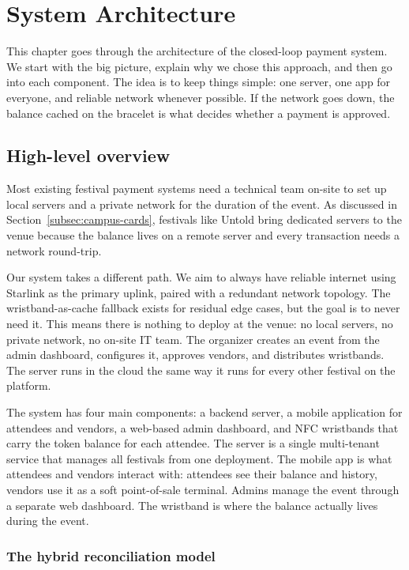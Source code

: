 \chapter{System Architecture}
\label{chap:architecture}

This chapter goes through the architecture of the closed-loop payment system. We start with the big picture, explain why we chose this approach, and then go into each component. The idea is to keep things simple: one server, one app for everyone, and reliable network whenever possible. If the network goes down, the balance cached on the bracelet is what decides whether a payment is approved.

\section{High-level overview}
\label{sec:high-level-overview}

Most existing festival payment systems need a technical team on-site to set up local servers and a private network for the duration of the event. As discussed in Section~\ref{subsec:campus-cards}, festivals like Untold bring dedicated servers to the venue because the balance lives on a remote server and every transaction needs a network round-trip.

Our system takes a different path. We aim to always have reliable internet using Starlink as the primary uplink, paired with a redundant network topology. The wristband-as-cache fallback exists for residual edge cases, but the goal is to never need it. This means there is nothing to deploy at the venue: no local servers, no private network, no on-site IT team. The organizer creates an event from the admin dashboard, configures it, approves vendors, and distributes wristbands. The server runs in the cloud the same way it runs for every other festival on the platform.

The system has four main components: a backend server, a mobile application for attendees and vendors, a web-based admin dashboard, and NFC wristbands that carry the token balance for each attendee. The server is a single multi-tenant service that manages all festivals from one deployment. The mobile app is what attendees and vendors interact with: attendees see their balance and history, vendors use it as a soft point-of-sale terminal. Admins manage the event through a separate web dashboard. The wristband is where the balance actually lives during the event.

\subsection{The hybrid reconciliation model}
\label{subsec:hybrid-overview}


